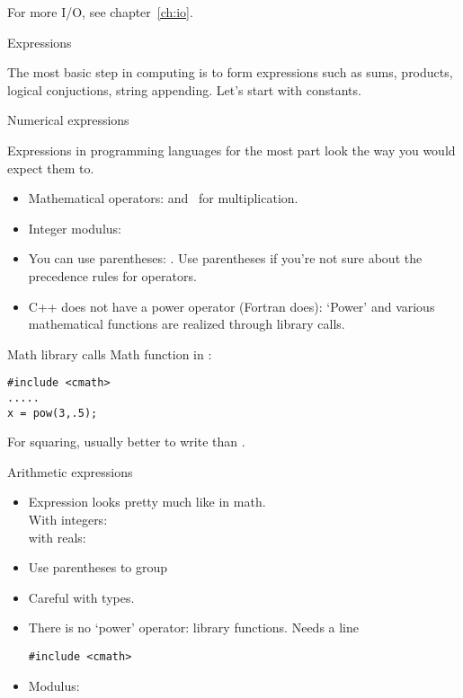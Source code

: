 For more I/O, see chapter~\ref{ch:io}.

 {Expressions}
\label{sec:expr}

The most basic step in computing is to form expressions such as sums,
products, logical conjuctions, string appending. Let's start with
constants.

 {Numerical expressions}

Expressions in
programming languages for the most part look the way you would expect
them to.
\begin{itemize}
\item Mathematical operators: \n{+ - /} and \n{*}~for multiplication.
\item Integer modulus:~
\item You can use parentheses: . Use parentheses if you're
  not sure about the precedence rules for operators.
\item C++ does not have a power operator (Fortran does): `Power' and
  various mathematical functions are realized through library calls.
\end{itemize}

\begin{block}{Math library calls}
  \label{sl:cmath}
  Math function in :
\begin{lstlisting}
#include <cmath>
.....
x = pow(3,.5);
\end{lstlisting}
For squaring, usually better to write  than .
\end{block}

\begin{slide}{Arithmetic expressions}
  \label{sl:arith-expr}
  \begin{itemize}
  \item
    Expression looks pretty much like in math.\\
    With integers: \\
    with reals: 
  \item Use parentheses to group 
  \item Careful with types.
  \item There is no `power' operator: library functions. Needs a line
\begin{lstlisting}
#include <cmath>
\end{lstlisting}
  \item Modulus: 
  \end{itemize}
\end{slide}

